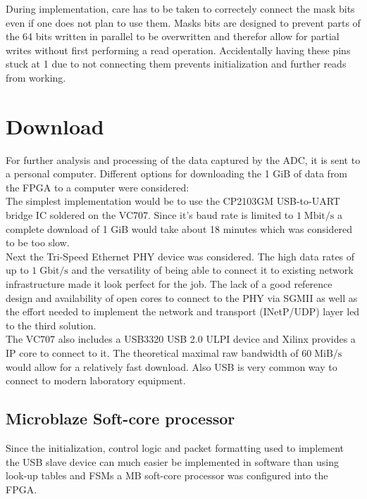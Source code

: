 During implementation, care has to be taken to correctely connect the mask bits
even if one does not plan to use them.
Masks bits are designed to prevent parts of the 64 bits written in parallel
to be overwritten and therefor allow for partial writes without first performing
a read operation. Accidentally having these pins stuck at 1 due to
not connecting them prevents initialization and further reads from
working. \\

\section{Download}
\label{sec:fpga_download}
For further analysis and processing of the data captured by the \gls{ADC},
it is sent to a personal computer.
Different options for downloading the 1 GiB of data from the \gls{FPGA}
to a computer were considered: \\

The simplest implementation would be to use the CP2103GM
\acrshort{USB}-to-\acrshort{UART} bridge \gls{IC} soldered on the VC707.
Since it's baud rate is limited to $1 \;\text{Mbit}/\text{s}$
a complete download of 1 GiB would take about 18 minutes which was
considered to be too slow. \\

Next the Tri-Speed Ethernet \gls{PHY} device was considered.
The high data rates of up to $1 \;\text{Gbit}/\text{s}$ and the versatility
of being able to connect it to existing network infrastructure made
it look perfect for the job. The lack of a good reference design and
availability of open cores to connect to the \gls{PHY} via
\gls{SGMII} as well as the effort needed to implement
the network and transport (\gls{INetP}/\gls{UDP}) layer
led to the third solution. \\

The VC707 also includes a USB3320 USB 2.0 ULPI device and Xilinx provides
a \gls{IP} core to connect to it. The theoretical maximal
raw bandwidth of $60 \;\text{MiB}/\text{s}$ would allow for a relatively fast
download. Also \gls{USB} is very common way to connect to modern laboratory
equipment.

\subsection{Microblaze Soft-core processor}
Since the initialization, control logic and packet formatting
used to implement the \gls{USB} slave device can much easier be implemented
in software than using look-up tables and \glspl{FSM} a
\gls{MB} soft-core processor was configured into the \gls{FPGA}. \\

